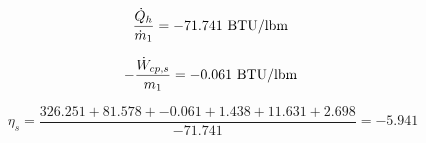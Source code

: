 \documentclass{article}
\begin{document}
\begin{equation}
\frac{\dot{Q}_{h}}{\dot{m}_{1}} =  -71.741\textnormal{ BTU/lbm                   }
\end{equation}

\begin{equation}
-\frac{\dot{W}_{cp ,s}}{m_1} =   -0.061\textnormal{ BTU/lbm                   }
\end{equation}

\begin{equation}
\eta_{s} = \frac{ 326.251 +   81.578 +   -0.061 +    1.438 +   11.631 +    2.698}{ -71.741} =   -5.941
\end{equation}
\end{document}
